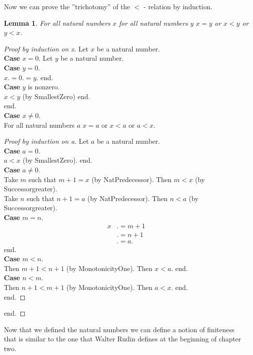\documentclass[10pt]{article}
\newenvironment{forthel}{\begin{leftbar}}{\end{leftbar}}
\theoremstyle{definition}
\theoremstyle{plain}
\newtheorem{lemma}[theorem]{Lemma}
\theoremstyle{remark}
\begin{document}
Now we can prove the ''trichotomy'' of the $<$ - relation by induction. 
\begin{forthel}
	\begin{lemma}
		For all natural numbers $x$ for all natural numbers $y$ $x=y$ or $x<y$ or $y<x$.
	\end{lemma}
	\begin{proof}[Proof by induction on x]
		Let $x$ be a natural number.\\
		\textbf{Case} $x=0$. Let $y$ be a natural number. \\
		\textbf{Case} $y=0$. \\
			$x .= 0 .= y$. end. \\
		\textbf{Case} $y$ is nonzero. \\
		$x<y$ (by SmallestZero) end. \\
		end. \\
		\textbf{Case} $x \neq 0$. \\
		For all natural numbers $a$ $x=a$ or $x<a$ or $a<x$.
		\begin{proof}[Proof by induction on a]
			Let $a$ be a natural number. \\
			\textbf{Case} $a=0$. \\
			$a<x$ (by SmallestZero). end. \\
			\textbf{Case} $a\neq 0$. \\
			Take $m$ such that $m+1=x$ (by NatPredecessor). Then $m<x$ (by Successorgreater). \\
			Take $n$ such that $n+1=a$ (by NatPredecessor). Then $n<a$ (by Successorgreater). \\
			\textbf{Case} $m=n$. \\
			\begin{align*}
				x &.= m+1 \\
				  &.= n+1 \\
				  &.= a.
			\end{align*}
			end. \\
			\textbf{Case} $m<n$.\\
			Then $m+1 < n +1$ (by MonotonicityOne). Then $x<a$. end. \\
			\textbf{Case} $n<m$. \\
			Then $n+1 < m+1$ (by MonotonicityOne). Then $a<x$. end. \\
			end.
		\end{proof}
		end.
	\end{proof}
\end{forthel}
Now that we defined the natural numbers we can define a notion of finiteness that is similar to the one that Walter Rudin defines at the beginning of chapter two.
\end{document}
